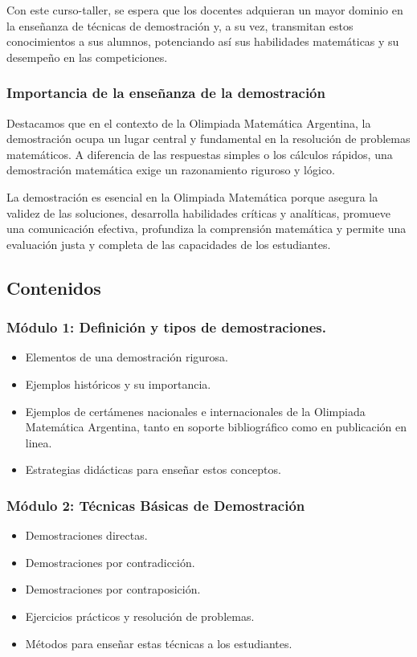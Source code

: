 Con este curso-taller, se espera que los docentes adquieran un mayor dominio en la enseñanza de técnicas de demostración y, a su vez, transmitan estos conocimientos a sus alumnos, potenciando así sus habilidades matemáticas y su desempeño en las competiciones.

\subsubsection{Importancia de la enseñanza de la demostración}

Destacamos que en el contexto de la Olimpiada Matemática Argentina, la demostración ocupa un lugar central y fundamental en la resolución de problemas matemáticos. A diferencia de las respuestas simples o los cálculos rápidos, una demostración matemática exige un razonamiento riguroso y lógico.

La demostración es esencial en la Olimpiada Matemática porque asegura la validez de las soluciones, desarrolla habilidades críticas y analíticas, promueve una comunicación efectiva, profundiza la comprensión matemática y permite una evaluación justa y completa de las capacidades
de los estudiantes.

\subsection{Contenidos}

\subsubsection{Módulo 1: Definición y tipos de demostraciones.}
\begin{itemize}
	\item Elementos de una demostración rigurosa.
	\item Ejemplos históricos y su importancia.
	\item Ejemplos de certámenes nacionales e internacionales de la Olimpiada Matemática Argentina, tanto en soporte bibliográfico como en publicación en linea.
	\item Estrategias didácticas para enseñar estos conceptos.
\end{itemize}

\subsubsection{Módulo 2: Técnicas Básicas de Demostración}
\begin{itemize}
	\item Demostraciones directas.
	\item Demostraciones por contradicción.
	\item Demostraciones por contraposición.
	\item Ejercicios prácticos y resolución de problemas.
	\item Métodos para enseñar estas técnicas a los estudiantes.
\end{itemize}

